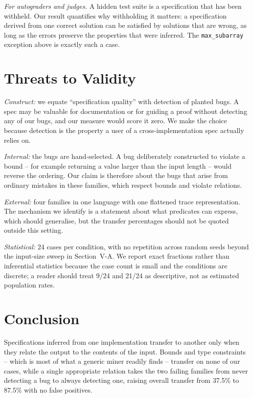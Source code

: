 \documentclass[conference]{IEEEtran}
\begin{document}
\textit{For autograders and judges.} A hidden test suite is a specification that has been
withheld. Our result quantifies why withholding it matters: a specification derived from
one correct solution can be satisfied by solutions that are wrong, as long as the errors
preserve the properties that were inferred. The \texttt{max\_subarray} exception above is
exactly such a case.

\section{Threats to Validity}

\textit{Construct:} we equate ``specification quality'' with detection of planted bugs. A
spec may be valuable for documentation or for guiding a proof without detecting any of our
bugs, and our measure would score it zero. We make the choice because detection is the
property a user of a cross-implementation spec actually relies on.

\textit{Internal:} the bugs are hand-selected. A bug deliberately constructed to violate a
bound -- for example returning a value larger than the input length -- would reverse the
ordering. Our claim is therefore about the bugs that arise from ordinary mistakes in these
families, which respect bounds and violate relations.

\textit{External:} four families in one language with one flattened trace representation.
The mechanism we identify is a statement about what predicates can express, which should
generalise, but the transfer percentages should not be quoted outside this setting.

\textit{Statistical:} 24 cases per condition, with no repetition across random seeds beyond
the input-size sweep in Section~V-A. We report exact fractions rather than inferential
statistics because the case count is small and the conditions are discrete; a reader should
treat 9/24 and 21/24 as descriptive, not as estimated population rates.

\section{Conclusion}

Specifications inferred from one implementation transfer to another only when they relate
the output to the contents of the input. Bounds and type constraints -- which is most of
what a generic miner readily finds -- transfer on none of our cases, while a single
appropriate relation takes the two failing families from never detecting a bug to always
detecting one, raising overall transfer from 37.5\% to 87.5\% with no false positives.
\end{document}
